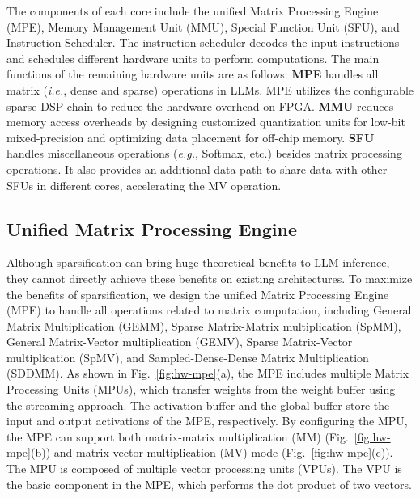 The components of each core include the unified Matrix Processing Engine (MPE), Memory Management Unit (MMU), Special Function Unit (SFU), and Instruction Scheduler. The instruction scheduler decodes the input instructions and schedules different hardware units to perform computations. The main functions of the remaining hardware units are as follows: \textbf{MPE} handles all matrix (\textit{i.e.}, dense and sparse) operations in LLMs. MPE utilizes the configurable sparse DSP chain to reduce the hardware overhead on FPGA.
\textbf{MMU} reduces memory access overheads by designing customized quantization units for low-bit mixed-precision and optimizing data placement for off-chip memory.
\textbf{SFU} handles miscellaneous operations (\textit{e.g.}, Softmax, etc.) besides matrix processing operations. It also provides an additional data path to share data with other SFUs in different cores, accelerating the MV operation.


\vspace{-5pt}
\subsection{Unified Matrix Processing Engine}

Although sparsification can bring huge theoretical benefits to LLM inference, they cannot directly achieve these benefits on existing architectures. To maximize the benefits of sparsification, we design the unified Matrix Processing Engine (MPE) to handle all operations related to matrix computation, including General Matrix Multiplication (GEMM), Sparse Matrix-Matrix multiplication (SpMM), General Matrix-Vector multiplication (GEMV), Sparse Matrix-Vector multiplication (SpMV), and Sampled-Dense-Dense Matrix Multiplication (SDDMM). As shown in Fig.~\ref{fig:hw-mpe}(a), the MPE includes multiple Matrix Processing Units (MPUs), which transfer weights from the weight buffer using the streaming approach. The activation buffer and the global buffer store the input and output activations of the MPE, respectively.
By configuring the MPU, the MPE can support both matrix-matrix multiplication (MM) (Fig.~\ref{fig:hw-mpe}(b)) and matrix-vector multiplication (MV) mode (Fig.~\ref{fig:hw-mpe}(c)). The MPU is composed of multiple vector processing units (VPUs). The VPU is the basic component in the MPE, which performs the dot product of two vectors.


